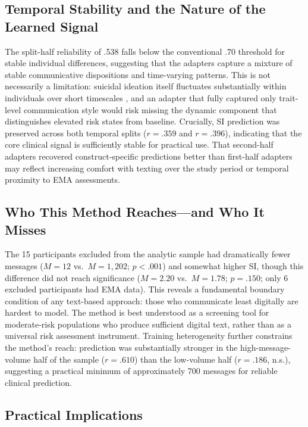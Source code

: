 \documentclass[review,12pt,authoryear]{elsarticle}
\begin{document}
\subsection{Temporal Stability and the Nature of the Learned Signal}

The split-half reliability of .538 falls below the conventional .70 threshold for stable individual differences, suggesting that the adapters capture a mixture of stable communicative dispositions and time-varying patterns. This is not necessarily a limitation: suicidal ideation itself fluctuates substantially within individuals over short timescales \citep{kleiman2017examination}, and an adapter that fully captured only trait-level communication style would risk missing the dynamic component that distinguishes elevated risk states from baseline. Crucially, SI prediction was preserved across both temporal splits ($r = .359$ and $r = .396$), indicating that the core clinical signal is sufficiently stable for practical use. That second-half adapters recovered construct-specific predictions better than first-half adapters may reflect increasing comfort with texting over the study period or temporal proximity to EMA assessments.

\subsection{Who This Method Reaches---and Who It Misses}

The 15 participants excluded from the analytic sample had dramatically fewer messages ($M = 12$ vs.\ $M = 1{,}202$; $p < .001$) and somewhat higher SI, though this difference did not reach significance ($M = 2.20$ vs.\ $M = 1.78$; $p = .150$; only 6 excluded participants had EMA data). This reveals a fundamental boundary condition of any text-based approach: those who communicate least digitally are hardest to model. The method is best understood as a screening tool for moderate-risk populations who produce sufficient digital text, rather than as a universal risk assessment instrument. Training heterogeneity further constrains the method's reach: prediction was substantially stronger in the high-message-volume half of the sample ($r = .610$) than the low-volume half ($r = .186$, n.s.), suggesting a practical minimum of approximately 700 messages for reliable clinical prediction.

\subsection{Practical Implications}
\end{document}
